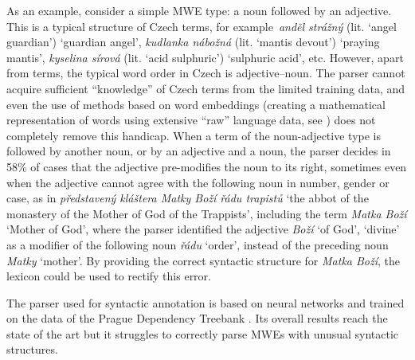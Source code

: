 \documentclass[output=paper,colorlinks,citecolor=brown]{langscibook}
\begin{document}
As an example, consider a simple MWE type: a noun followed by an adjective. This is a typical structure of Czech terms, for example\ \emph{anděl strážný} (lit. `angel guardian') ‘guardian angel’, \emph{kudlanka nábožná} (lit. `mantis devout') ‘praying mantis’, \emph{kyselina sírová} (lit. `acid sulphuric') ‘sulphuric acid’, etc. However, apart from
terms, the typical word order in Czech is adjective--noun. The parser cannot acquire sufficient “knowledge” of Czech terms from the limited training data, and even the use of methods based on word embeddings (creating a mathematical representation of words using extensive ``raw'' language data, see \cite{Mikolov:etal:2013}) does not completely remove this handicap. When a term of the noun-adjective type is followed by another noun, or by an adjective and a noun, the parser decides in 58\% of cases that the adjective pre-modifies the noun to its right, sometimes even when the adjective cannot agree with the following noun in number, gender or case, as in \emph{představený kláštera Matky Boží řádu trapistů} ‘the abbot of the monastery of the Mother of God of the Trappists’, including the term \emph{Matka Boží} ‘Mother of God’, where the parser identified the adjective \emph{Boží} ‘of God’,  `divine’ as a modifier of the following noun \emph{řádu} ‘order’, instead of the preceding noun \emph{Matky} ‘mother’. By providing the correct syntactic structure for \emph{Matka Boží}, the lexicon could be used to rectify this error.

The parser used for syntactic annotation is based on neural networks \citep{Ma:etal:2018} and trained on the data of the Prague Dependency Treebank \citep{Hajic:etal:2018}. Its overall results reach the state of the art but it struggles to correctly parse MWEs with unusual syntactic structures.
\end{document}
